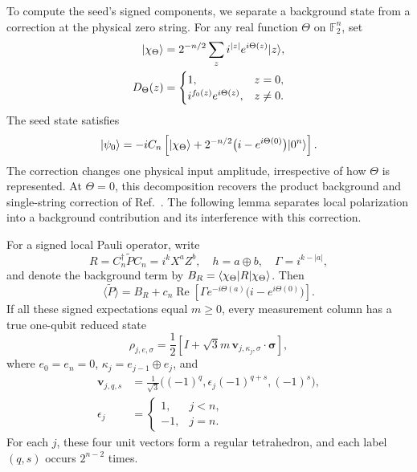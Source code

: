 To compute the seed's signed components, we separate a background state from a correction at the physical zero string. For any real function $\Theta$ on $\mathbb F_2^n$, set
\begin{align}
 \lvert \chi_\Theta\rangle&=2^{-n/2}\sum_z i^{|z|}e^{i\Theta(z)}\lvert z\rangle,\nonumber\\
 D_\Theta(z)&=\begin{cases}1,&z=0,\\
 i^{f_0(z)}e^{i\Theta(z)},&z\ne0.
 \end{cases}
 \label{core:background}
\end{align}
The seed state satisfies
\begin{equation}
 \lvert \psi_0\rangle=-iC_n\left[\lvert \chi_\Theta\rangle
 +2^{-n/2}\big(i-e^{i\Theta(0)}\big)\lvert 0^n\rangle\right].
 \label{core:defect-state}
\end{equation}
The correction changes one physical input amplitude, irrespective of how $\Theta$ is represented. At $\Theta=0$, this decomposition recovers the product background and single-string correction of Ref.~\cite{PauwelsGisin2026}. The following lemma separates local polarization into a background contribution and its interference with this correction.

\begin{lemma}
\label{core:mechanism}
For a signed local Pauli operator, write
\begin{equation}
 R=C_n^\dagger\widetilde P C_n=i^kX^aZ^b,\quad
 h=a\oplus b,\quad\Gamma=i^{k-|a|},
 \label{core:pauli-notation}
\end{equation}
and denote the background term by $B_R=\langle \chi_\Theta\rvert R\lvert \chi_\Theta\rangle$. Then
\begin{equation}
 \langle\widetilde P\rangle
 =B_R+c_n\operatorname{Re}\!\left[
 \Gamma e^{-i\Theta(a)}\big(i-e^{i\Theta(0)}\big)\right].
 \label{core:signal}
\end{equation}
If all these signed expectations equal $m\ge0$, every measurement column has a true one-qubit reduced state
\begin{equation}
 \rho_{j,e,\sigma}
 =\frac12\left[I+\sqrt3m\,\mathbf v_{j,\kappa_j,\sigma}
 \cdot\boldsymbol\sigma\right],
 \label{core:bloch-orbit}
\end{equation}
where $e_0=e_n=0$, $\kappa_j=e_{j-1}\oplus e_j$, and
\begin{equation}
 \begin{aligned}
 \mathbf v_{j,q,s}&=\frac1{\sqrt3}
 \big((-1)^q,\epsilon_j(-1)^{q+s},(-1)^s\big),\\
 \epsilon_j&=\begin{cases}1,&j<n,\\-1,&j=n.\end{cases}
 \end{aligned}
 \label{core:vertices}
\end{equation}
For each $j$, these four unit vectors form a regular tetrahedron, and each label $(q,s)$ occurs $2^{n-2}$ times.
\end{lemma}

